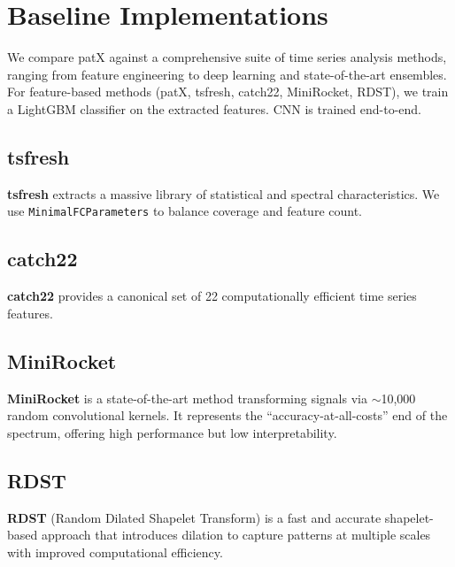 

\section{Baseline Implementations}

We compare patX against a comprehensive suite of time series analysis methods,
ranging from feature engineering to deep learning and state-of-the-art ensembles.
For feature-based methods (patX, tsfresh, catch22, MiniRocket, RDST), we train a
LightGBM classifier on the extracted features. CNN is trained end-to-end.

\subsection{tsfresh}
\textbf{tsfresh} \cite{christ2018tsfresh} extracts a massive library of
statistical and spectral characteristics. We use \texttt{MinimalFCParameters} to
balance coverage and feature count.

\subsection{catch22}
\textbf{catch22} \cite{lubba2019catch22} provides a canonical set of 22
computationally efficient time series features.

\subsection{MiniRocket}
\textbf{MiniRocket} \cite{dempster2021minirocket} is a state-of-the-art
method transforming signals via $\sim$10,000 random convolutional kernels.
It represents the ``accuracy-at-all-costs'' end of the spectrum, offering high
performance but low interpretability.

\subsection{RDST}
\textbf{RDST} \cite{guillaume2022random} (Random Dilated Shapelet Transform) is a
fast and accurate shapelet-based approach that introduces dilation to capture
patterns at multiple scales with improved computational efficiency.

